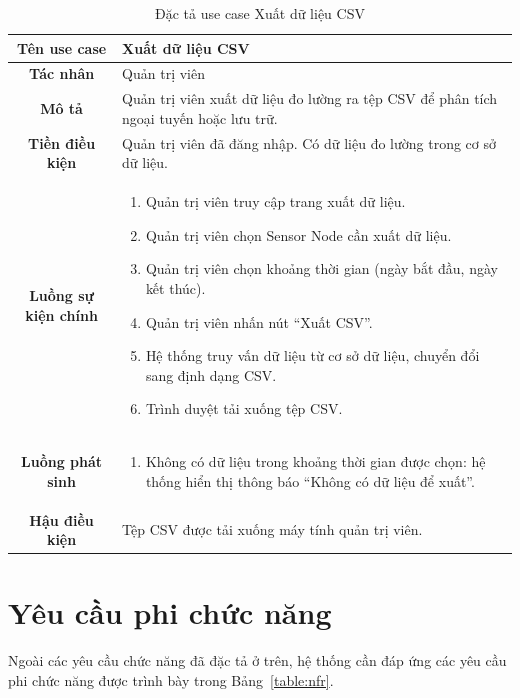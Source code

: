 \documentclass[../DoAn.tex]{subfiles}
\begin{document}
\begin{table}[H]
\centering
\caption{Đặc tả use case Xuất dữ liệu CSV}
\label{table:uc_export}
\small
\begin{tabularx}{\textwidth}{|c|X|}
\hline
\textbf{Tên use case} & Xuất dữ liệu CSV \\
\hline
\textbf{Tác nhân} & Quản trị viên \\
\hline
\textbf{Mô tả} & Quản trị viên xuất dữ liệu đo lường ra tệp CSV để phân tích ngoại tuyến hoặc lưu trữ. \\
\hline
\textbf{Tiền điều kiện} & Quản trị viên đã đăng nhập. Có dữ liệu đo lường trong cơ sở dữ liệu. \\
\hline
\textbf{Luồng sự kiện chính} &
\begin{enumerate}[leftmargin=*, nosep]
    \item Quản trị viên truy cập trang xuất dữ liệu.
    \item Quản trị viên chọn Sensor Node cần xuất dữ liệu.
    \item Quản trị viên chọn khoảng thời gian (ngày bắt đầu, ngày kết thúc).
    \item Quản trị viên nhấn nút ``Xuất CSV''.
    \item Hệ thống truy vấn dữ liệu từ cơ sở dữ liệu, chuyển đổi sang định dạng CSV.
    \item Trình duyệt tải xuống tệp CSV.
\end{enumerate} \\
\hline
\textbf{Luồng phát sinh} &
\begin{enumerate}[leftmargin=*, nosep]
    \item[5a.] Không có dữ liệu trong khoảng thời gian được chọn: hệ thống hiển thị thông báo ``Không có dữ liệu để xuất''.
\end{enumerate} \\
\hline
\textbf{Hậu điều kiện} & Tệp CSV được tải xuống máy tính quản trị viên. \\
\hline
\end{tabularx}
\end{table}

\section{Yêu cầu phi chức năng}
\label{section:2.4}

Ngoài các yêu cầu chức năng đã đặc tả ở trên, hệ thống cần đáp ứng các yêu cầu phi chức năng được trình bày trong Bảng~\ref{table:nfr}.
\end{document}
